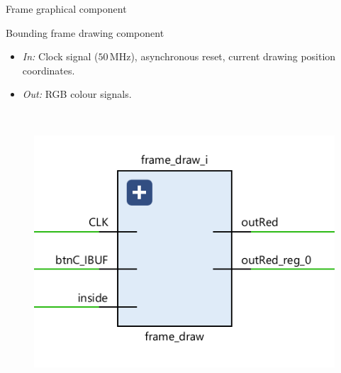 \documentclass[aspectratio=169, 11pt, hyperref={unicode}]{beamer}
\def\MHz{\,\mathrm{MHz}}
\begin{document}
\begin{frame}{Frame graphical component}
    \begin{minipage}{.45\textwidth}
        Bounding frame drawing component
        \begin{itemize}
            \item \emph{In:} Clock signal ($50\MHz$), asynchronous reset, current drawing position coordinates.
            \item \emph{Out:} RGB colour signals.
        \end{itemize}
    \end{minipage}
    ~
    \begin{minipage}{.45\textwidth}
        \begin{figure}[!ht]
            \centering
            \includegraphics[width=\textwidth]{src/frame-draw.png}
        \end{figure}
    \end{minipage}
\end{frame}
\end{document}
